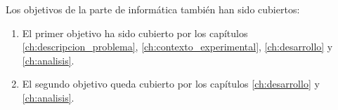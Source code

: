     Los objetivos de la parte de informática también han sido cubiertos:
    \begin{enumerate}
        \item El primer objetivo ha sido cubierto por los capítulos \ref{ch:descripcion_problema}, \ref{ch:contexto_experimental}, \ref{ch:desarrollo} y \ref{ch:analisis}.
        \item El segundo objetivo queda cubierto por los capítulos \ref{ch:desarrollo} y \ref{ch:analisis}.
    \end{enumerate}





    


\endinput